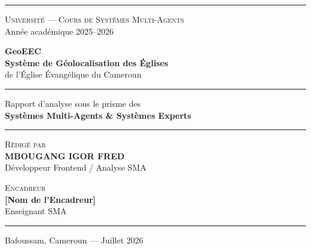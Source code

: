 \documentclass[12pt, a4paper]{report}
\theoremstyle{definition}
\begin{document}
\begin{titlepage}
\begin{center}
\vspace*{1cm}

{\color{eecNavy}\rule{\linewidth}{2pt}}
\vspace{0.5cm}

{\color{eecMid}\large\scshape Université — Cours de Systèmes Multi-Agents}\\[0.4cm]
{\color{eecMid}\normalsize Année académique 2025--2026}

\vspace{1.5cm}

{\color{eecGold}\Huge\bfseries GeoEEC}\\[0.3cm]
{\color{eecNavy}\LARGE\bfseries Système de Géolocalisation des Églises}\\[0.3cm]
{\color{eecNavy}\Large de l'Église Évangélique du Cameroun}

\vspace{1cm}

{\color{eecNavy}\rule{\linewidth}{0.5pt}}
\vspace{0.5cm}

{\color{eecMid}\Large Rapport d'analyse sous le prisme des}\\[0.2cm]
{\color{eecNavy}\Large\bfseries Systèmes Multi-Agents \& Systèmes Experts}

\vspace{0.5cm}
{\color{eecNavy}\rule{\linewidth}{0.5pt}}

\vspace{2cm}

\begin{minipage}{0.45\textwidth}
\begin{flushleft}
{\color{eecMid}\small\scshape Rédigé par}\\[0.2cm]
{\color{eecNavy}\bfseries MBOUGANG IGOR FRED}\\[0.1cm]
{\color{eecMid}\small Développeur Frontend / Analyse SMA}
\end{flushleft}
\end{minipage}
\hfill
\begin{minipage}{0.45\textwidth}
\begin{flushright}
{\color{eecMid}\small\scshape Encadreur}\\[0.2cm]
{\color{eecNavy}\bfseries [Nom de l'Encadreur]}\\[0.1cm]
{\color{eecMid}\small Enseignant SMA}
\end{flushright}
\end{minipage}

\vfill

{\color{eecNavy}\rule{\linewidth}{2pt}}
\vspace{0.3cm}
{\color{eecMid}\small Bafoussam, Cameroun — Juillet 2026}

\end{center}
\end{titlepage}
\end{document}
